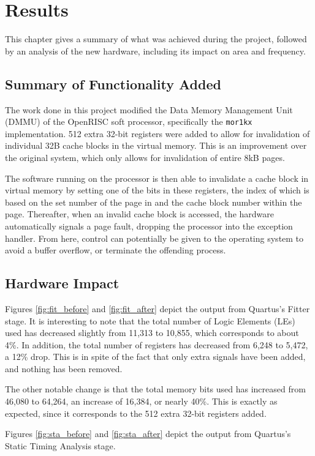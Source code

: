 \chapter{Results}
\label{cha:results}
This chapter gives a summary of what was achieved during the project, followed by an analysis of the new hardware, including its impact on area and frequency.

\section{Summary of Functionality Added}
The work done in this project modified the Data Memory Management Unit (DMMU) of the OpenRISC soft processor, specifically the \texttt{mor1kx} implementation.
512 extra 32-bit registers were added to allow for invalidation of individual 32B cache blocks in the virtual memory. This is an improvement over the original system, which only allows for invalidation of entire 8kB pages.

The software running on the processor is then able to invalidate a cache block in virtual memory by setting one of the bits in these registers, the index of which is based on the set number of the page in and the cache block number within the page.
Thereafter, when an invalid cache block is accessed, the hardware automatically signals a page fault, dropping the processor into the exception handler. From here, control can potentially be given to the operating system to avoid a buffer overflow, or terminate the offending process.

\section{Hardware Impact}
Figures \ref{fig:fit_before} and \ref{fig:fit_after} depict the output from Quartus's Fitter stage. It is interesting to note that the total number of Logic Elements (LEs) used has decreased slightly from 11,313 to 10,855, which corresponds to about 4\%. In addition, the total number of registers has decreased from 6,248 to 5,472, a 12\% drop. This is in spite of the fact that only extra signals have been added, and nothing has been removed.

The other notable change is that the total memory bits used has increased from 46,080 to 64,264, an increase of 16,384, or nearly 40\%. This is exactly as expected, since it corresponds to the 512 extra 32-bit registers added.

Figures \ref{fig:sta_before} and \ref{fig:sta_after} depict the output from Quartus's Static Timing Analysis stage.

